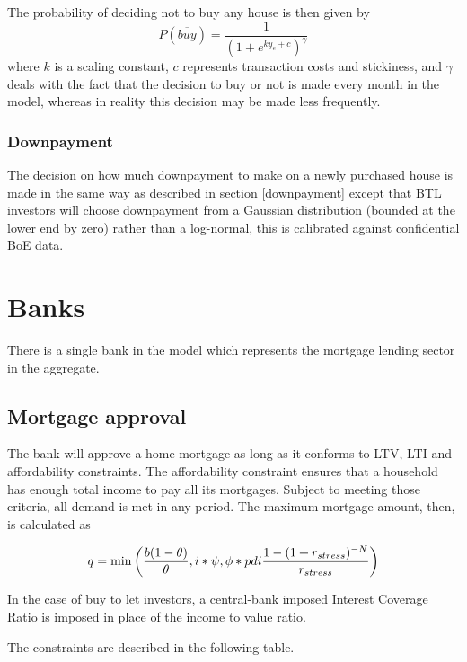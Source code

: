 \documentclass{article}
\begin{document}
The probability of deciding not to buy any house is then given by
\[
P(\overline{buy}) = \frac{1}{(1 + e^{ky_e+c})^\gamma}
\]
where $k$ is a scaling constant, $c$ represents transaction costs and stickiness, and $\gamma$ deals with the fact that the decision to buy or not is made every month in the model, whereas in reality this decision may be made less frequently.

\subsubsection{Downpayment}
The decision on how much downpayment to make on a newly purchased house is made in the same way as described in section \ref{downpayment} except that BTL investors will choose downpayment from a Gaussian distribution (bounded at the lower end by zero) rather than a log-normal, this is calibrated against confidential BoE data.

\section{Banks}

There is a single bank in the model which represents the mortgage lending
sector in the aggregate.

\subsection{Mortgage approval}
The bank will approve a home mortgage as long as it
conforms to LTV, LTI and affordability constraints. The affordability
constraint ensures that a household has enough total income to pay all its
mortgages. Subject to meeting those criteria, all demand is met in any
period. The maximum mortgage amount, then, is calculated as

\bigskip 
\begin{equation}
q=\min \left( \frac{b(1-\theta )}{\theta },i\ast \psi ,\phi \ast pdi\frac{%
1-(1+r_{stress})^{-N}}{r_{stress}}\right)
\end{equation}

\bigskip

In the case of buy to let investors, a central-bank imposed Interest Coverage Ratio is imposed in place of the income to value ratio.

\bigskip The constraints are described in the following table.

\bigskip
\end{document}
